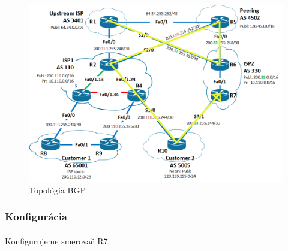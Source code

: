 \documentclass[12pt,twoside,a4paper]{report}
\begin{document}
\begin{figure}[!htbp]
\centering
\includegraphics[width=14cm,keepaspectratio]{bgp_isis_r4_r10_primary}
\caption{Topológia BGP}
\label{fig:bgp_isis_topo}
\end{figure}

\subsubsection{Konfigurácia}
\paragraph{}
Konfigurujeme smerovač R7.
\end{document}
